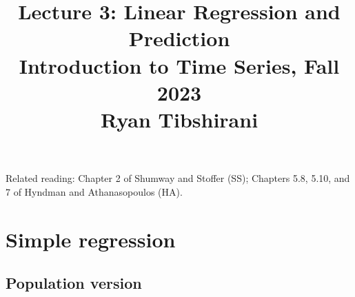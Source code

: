 \documentclass{article}
\title{Lecture 3: Linear Regression and Prediction \\ \smallskip  
\large Introduction to Time Series, Fall 2023 \\ \smallskip
Ryan Tibshirani}
\date{}
\begin{document}
\maketitle
\RaggedRight
\vspace{-50pt}

Related reading: Chapter 2 of Shumway and Stoffer (SS); Chapters 5.8, 5.10, and
7 of Hyndman and Athanasopoulos (HA).   

\section{Simple regression}

\subsection{Population version}
\end{document}
